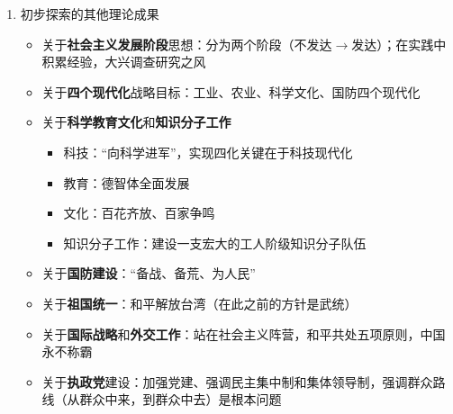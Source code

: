 \documentclass[12pt,openany]{ctexbook}
\begin{document}
\begin{enumerate}
\begin{itemize}
  \item 走中国工业化道路
\begin{itemize}
  \item 必须采取正确的\textbf{经济建设方针}
  \item 必须调整和完善\textbf{所有制结构}
  \item 必须积极探索适合我国情况的\textbf{经济体制和运行机制}
\end{itemize}
\end{itemize}
  \item 初步探索的其他理论成果
\begin{itemize}
  \item 关于\textbf{社会主义发展阶段}思想：分为两个阶段（不发达$\to$发达）；在实践中积累经验，大兴调查研究之风
  \item 关于\textbf{四个现代化}战略目标：工业、农业、科学文化、国防四个现代化
  \item 关于\textbf{科学教育文化}和\textbf{知识分子工作}
\begin{itemize}
  \item 科技：“向科学进军”，实现四化关键在于科技现代化
  \item 教育：德智体全面发展
  \item 文化：百花齐放、百家争鸣
  \item 知识分子工作：建设一支宏大的工人阶级知识分子队伍
\end{itemize}
  \item 关于\textbf{国防建设}：“备战、备荒、为人民”
  \item 关于\textbf{祖国统一}：和平解放台湾（在此之前的方针是武统）
  \item 关于\textbf{国际战略}和\textbf{外交工作}：站在社会主义阵营，和平共处五项原则，中国永不称霸
  \item 关于\textbf{执政党}建设：加强党建、强调民主集中制和集体领导制，强调群众路线（从群众中来，到群众中去）是根本问题
\end{itemize}
\end{enumerate}
\end{document}
